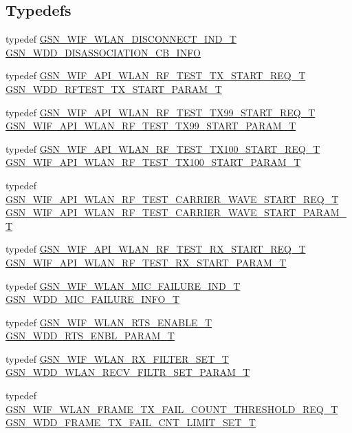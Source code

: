 \subsection*{Typedefs}
\begin{DoxyCompactItemize}
\item 
typedef \hyperlink{a00379}{GSN\_\-WIF\_\-WLAN\_\-DISCONNECT\_\-IND\_\-T} \hyperlink{a00603_a862addfd6eccb0fedeaaa04732f94d5b}{GSN\_\-WDD\_\-DISASSOCIATION\_\-CB\_\-INFO}
\item 
typedef \hyperlink{a00187}{GSN\_\-WIF\_\-API\_\-WLAN\_\-RF\_\-TEST\_\-TX\_\-START\_\-REQ\_\-T} \hyperlink{a00603_a842373dad0ceeafe062cf1827dbd8e54}{GSN\_\-WDD\_\-RFTEST\_\-TX\_\-START\_\-PARAM\_\-T}
\item 
typedef \hyperlink{a00190}{GSN\_\-WIF\_\-API\_\-WLAN\_\-RF\_\-TEST\_\-TX99\_\-START\_\-REQ\_\-T} \hyperlink{a00603_ac1e5dbed32ee024fa928fd5f19962055}{GSN\_\-WIF\_\-API\_\-WLAN\_\-RF\_\-TEST\_\-TX99\_\-START\_\-PARAM\_\-T}
\item 
typedef \hyperlink{a00189}{GSN\_\-WIF\_\-API\_\-WLAN\_\-RF\_\-TEST\_\-TX100\_\-START\_\-REQ\_\-T} \hyperlink{a00603_aa8de226d51c4838cb6556845208d7ba3}{GSN\_\-WIF\_\-API\_\-WLAN\_\-RF\_\-TEST\_\-TX100\_\-START\_\-PARAM\_\-T}
\item 
typedef \hyperlink{a00185}{GSN\_\-WIF\_\-API\_\-WLAN\_\-RF\_\-TEST\_\-CARRIER\_\-WAVE\_\-START\_\-REQ\_\-T} \hyperlink{a00603_ae2e511d31a8a68f74e6cd794618e0383}{GSN\_\-WIF\_\-API\_\-WLAN\_\-RF\_\-TEST\_\-CARRIER\_\-WAVE\_\-START\_\-PARAM\_\-T}
\item 
typedef \hyperlink{a00186}{GSN\_\-WIF\_\-API\_\-WLAN\_\-RF\_\-TEST\_\-RX\_\-START\_\-REQ\_\-T} \hyperlink{a00603_ab667d44d0bbe167c0449134207cd6d9a}{GSN\_\-WIF\_\-API\_\-WLAN\_\-RF\_\-TEST\_\-RX\_\-START\_\-PARAM\_\-T}
\item 
typedef \hyperlink{a00391}{GSN\_\-WIF\_\-WLAN\_\-MIC\_\-FAILURE\_\-IND\_\-T} \hyperlink{a00603_a807e44a4a859b36de8babbf87eef011b}{GSN\_\-WDD\_\-MIC\_\-FAILURE\_\-INFO\_\-T}
\item 
typedef \hyperlink{a00396}{GSN\_\-WIF\_\-WLAN\_\-RTS\_\-ENABLE\_\-T} \hyperlink{a00603_acb20c85ccb97eb810fe9a5dbb403f1ae}{GSN\_\-WDD\_\-RTS\_\-ENBL\_\-PARAM\_\-T}
\item 
typedef \hyperlink{a00397}{GSN\_\-WIF\_\-WLAN\_\-RX\_\-FILTER\_\-SET\_\-T} \hyperlink{a00603_ad07f561fb358b50268072fff65afce3d}{GSN\_\-WDD\_\-WLAN\_\-RECV\_\-FILTR\_\-SET\_\-PARAM\_\-T}
\item 
typedef \hyperlink{a00381}{GSN\_\-WIF\_\-WLAN\_\-FRAME\_\-TX\_\-FAIL\_\-COUNT\_\-THRESHOLD\_\-REQ\_\-T} \hyperlink{a00603_a209fb3e1d53b9efa2241d6fd09de5de3}{GSN\_\-WDD\_\-FRAME\_\-TX\_\-FAIL\_\-CNT\_\-LIMIT\_\-SET\_\-T}

\end{DoxyCompactItemize}
